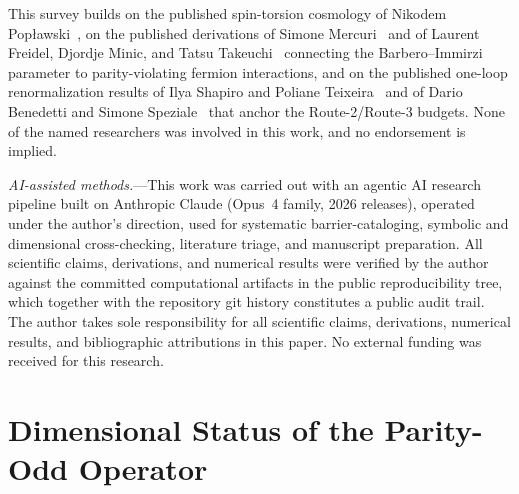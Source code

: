 \documentclass[aps,prd,twocolumn,superscriptaddress,showpacs,preprintnumbers,nofootinbib,longbibliography,floatfix]{revtex4-2}
\begin{document}
\begin{acknowledgments}
This survey builds on the published spin-torsion cosmology of Nikodem
Pop\l{}awski~\cite{Poplawski2010}, on the published derivations of Simone
Mercuri~\cite{Mercuri2009} and of Laurent Freidel, Djordje Minic, and
Tatsu Takeuchi~\cite{Freidel2005} connecting the Barbero--Immirzi
parameter to parity-violating fermion interactions, and on the published
one-loop renormalization results of Ilya Shapiro and Poliane
Teixeira~\cite{ShapiroTeixeira2014} and of Dario Benedetti and Simone
Speziale~\cite{BenedettiSpeziale2011run} that anchor the Route-2/Route-3
budgets. None of the named researchers was involved in this work, and no
endorsement is implied.

\emph{AI-assisted methods.}---This work was carried out with an agentic AI
research pipeline built on Anthropic Claude (Opus~4 family, 2026 releases),
operated under the author's direction, used for systematic barrier-cataloging,
symbolic and dimensional cross-checking, literature triage, and manuscript
preparation. All scientific claims, derivations, and numerical results were
verified by the author against the committed computational artifacts in the
public reproducibility tree, which together with the repository git history
constitutes a public audit trail. The author takes sole responsibility for
all scientific claims, derivations, numerical results, and bibliographic
attributions in this paper. No external funding was received for this
research.
\end{acknowledgments}

\appendix

\section{Dimensional Status of the Parity-Odd Operator}\label{app:dimensions}
\end{document}
